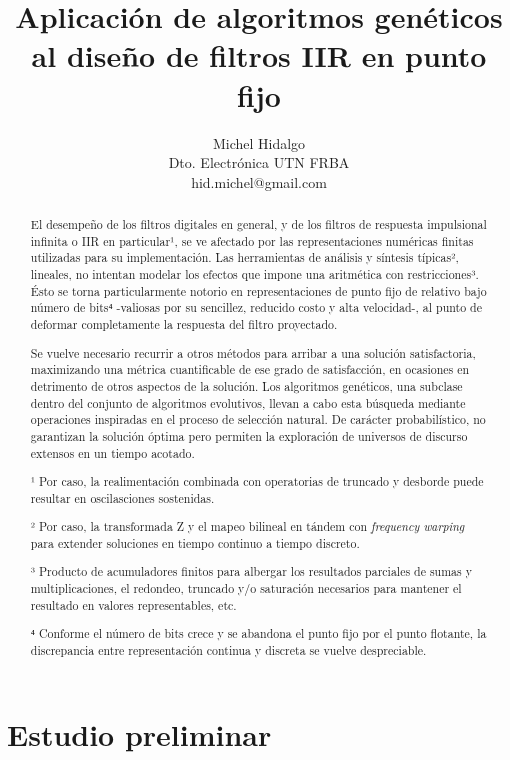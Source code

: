 \documentclass[11pt, journal]{IEEEtran}
\title{Aplicación de algoritmos genéticos al diseño de filtros IIR en punto fijo}
\author{Michel Hidalgo\\Dto. Electrónica UTN FRBA\\hid.michel@gmail.com}
\begin{document}
    \maketitle

    \begin{abstract}

    El desempeño de los filtros digitales en general, y de los filtros de
respuesta impulsional infinita o IIR en particular¹, se ve afectado por
las representaciones numéricas finitas utilizadas para su
implementación. Las herramientas de análisis y síntesis típicas²,
lineales, no intentan modelar los efectos que impone una aritmética con
restricciones³. Ésto se torna particularmente notorio en
representaciones de punto fijo de relativo bajo número de bits⁴
-valiosas por su sencillez, reducido costo y alta velocidad-, al punto
de deformar completamente la respuesta del filtro proyectado.

Se vuelve necesario recurrir a otros métodos para arribar a una solución
satisfactoria, maximizando una métrica cuantificable de ese grado de
satisfacción, en ocasiones en detrimento de otros aspectos de la
solución. Los algoritmos genéticos, una subclase dentro del conjunto de
algoritmos evolutivos, llevan a cabo esta búsqueda mediante operaciones
inspiradas en el proceso de selección natural. De carácter
probabilístico, no garantizan la solución óptima pero permiten la
exploración de universos de discurso extensos en un tiempo acotado.

¹ Por caso, la realimentación combinada con operatorias de truncado y
desborde puede resultar en oscilasciones sostenidas.

² Por caso, la transformada Z y el mapeo bilineal en tándem con
\emph{frequency warping} para extender soluciones en tiempo continuo a
tiempo discreto.

³ Producto de acumuladores finitos para albergar los resultados
parciales de sumas y multiplicaciones, el redondeo, truncado y/o
saturación necesarios para mantener el resultado en valores
representables, etc.

⁴ Conforme el número de bits crece y se abandona el punto fijo por el
punto flotante, la discrepancia entre representación continua y discreta
se vuelve despreciable.

\end{abstract}

    \section{Estudio preliminar}\label{estudio-preliminar}
\end{document}
